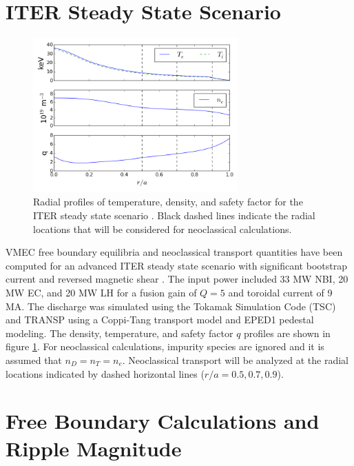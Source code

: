 \documentclass{article}
\begin{document}
\section{ITER Steady State Scenario}\label{steadystate}

\FloatBarrier

\begin{figure}[h!]
\centering
\includegraphics[width=0.7\textwidth]{profiles.png}
\caption{\label{fig:profiles} Radial profiles of temperature, density, and safety factor for the ITER steady state scenario \cite{Poli2014}. Black dashed lines indicate the radial locations that will be considered for neoclassical calculations.}
\end{figure}

VMEC free boundary equilibria and neoclassical transport quantities have been computed for an advanced ITER steady state scenario with significant bootstrap current and reversed magnetic shear \cite{Poli2014}. The input power included 33 MW NBI, 20 MW EC, and 20 MW LH for a fusion gain of $Q = 5$ and toroidal current of 9 MA. The discharge was simulated using the Tokamak Simulation Code (TSC) \cite{Jardin1986} and TRANSP \cite{Hawryluk1980} using a Coppi-Tang transport model and EPED1 \cite{Snyder2011} pedestal modeling. The density, temperature, and safety factor $q$ profiles are shown in figure \ref{fig:profiles}. For neoclassical calculations, impurity species are ignored and it is assumed that $n_D = n_T = n_e$. Neoclassical transport will be analyzed at the radial locations indicated by dashed horizontal lines ($r/a = 0.5, 0.7, 0.9$). 

\FloatBarrier

\section{Free Boundary Calculations and Ripple Magnitude} \label{vmec}
\end{document}
